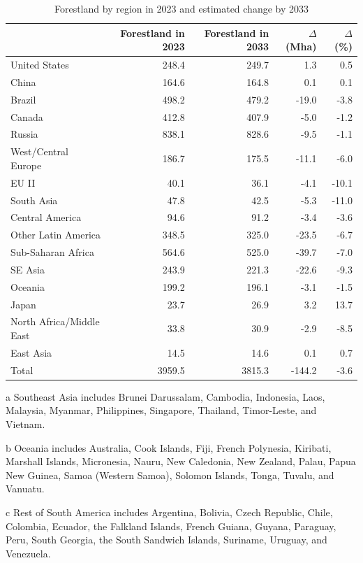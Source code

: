 \documentclass[
]{article}
\begin{document}
\begin{table}
\centering
\begin{threeparttable}
\caption{\label{tab:baseline-forest-change}Forestland by region in 2023 and estimated change by 2033}
\centering
\begin{tabular}[t]{|>{}l|r|r|r|>{}r|}
\hline
  & Forestland in 2023 & Forestland in 2033 & $\Delta$ (Mha) & $\Delta$ (\%)\\
\hline
United States & 248.4 & 249.7 & 1.3 & 0.5\\
\hline
China & 164.6 & 164.8 & 0.1 & 0.1\\
\hline
Brazil & 498.2 & 479.2 & -19.0 & -3.8\\
\hline
Canada & 412.8 & 407.9 & -5.0 & -1.2\\
\hline
Russia & 838.1 & 828.6 & -9.5 & -1.1\\
\hline
West/Central Europe & 186.7 & 175.5 & -11.1 & -6.0\\
\hline
EU II & 40.1 & 36.1 & -4.1 & -10.1\\
\hline
South Asia & 47.8 & 42.5 & -5.3 & -11.0\\
\hline
Central America & 94.6 & 91.2 & -3.4 & -3.6\\
\hline
Other Latin America & 348.5 & 325.0 & -23.5 & -6.7\\
\hline
Sub-Saharan Africa & 564.6 & 525.0 & -39.7 & -7.0\\
\hline
SE Asia & 243.9 & 221.3 & -22.6 & -9.3\\
\hline
Oceania & 199.2 & 196.1 & -3.1 & -1.5\\
\hline
Japan & 23.7 & 26.9 & 3.2 & 13.7\\
\hline
North Africa/Middle East & 33.8 & 30.9 & -2.9 & -8.5\\
\hline
East Asia & 14.5 & 14.6 & 0.1 & 0.7\\
\hline
Total & 3959.5 & 3815.3 & -144.2 & -3.6\\
\hline
\end{tabular}
\begin{tablenotes}
\small
\item [a] Southeast Asia includes Brunei Darussalam, Cambodia, Indonesia, Laos, Malaysia, Myanmar, Philippines, Singapore, Thailand, Timor-Leste, and Vietnam.
\item [b] Oceania includes Australia, Cook Islands, Fiji, French Polynesia, Kiribati, Marshall Islands, Micronesia, Nauru, New Caledonia, New Zealand, Palau, Papua New Guinea, Samoa (Western Samoa), Solomon Islands, Tonga, Tuvalu, and Vanuatu.
\item [c] Rest of South America includes Argentina, Bolivia, Czech Republic, Chile, Colombia, Ecuador, the Falkland Islands, French Guiana, Guyana, Paraguay, Peru, South Georgia, the South Sandwich Islands, Suriname, Uruguay, and Venezuela.

\end{tablenotes}
\end{threeparttable}
\end{table}
\end{document}
